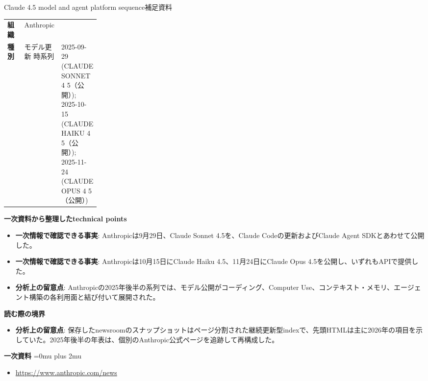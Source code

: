 \begin{technicalnote}{Claude 4.5 model and agent platform sequence}{補足資料}
\begingroup
\begin{tabularx}{\linewidth}{@{}>{\bfseries}p{0.22\linewidth}X@{}}
組織 & Anthropic \\
種別 & モデル更新
時系列 & 2025-09-29 (CLAUDE SONNET 4 5（公開）); 2025-10-15 (CLAUDE HAIKU 4 5（公開）); 2025-11-24 (CLAUDE OPUS 4 5（公開）) \\
\end{tabularx}
\smallskip
{\bfseries 一次資料から整理したtechnical points}
\begin{itemize}[leftmargin=1.5em,itemsep=0.35em]
\item \textbf{一次情報で確認できる事実}: Anthropicは9月29日、Claude Sonnet 4.5を、Claude Codeの更新およびClaude Agent SDKとあわせて公開した。
\item \textbf{一次情報で確認できる事実}: Anthropicは10月15日にClaude Haiku 4.5、11月24日にClaude Opus 4.5を公開し、いずれもAPIで提供した。
\item \textbf{分析上の留意点}: Anthropicの2025年後半の系列では、モデル公開がコーディング、Computer Use、コンテキスト・メモリ、エージェント構築の各利用面と結び付いて展開された。
\end{itemize}
\begin{minipage}{\linewidth}
{\bfseries 読む際の境界}
\begin{itemize}[leftmargin=1.5em,itemsep=0.35em]
\item \textbf{分析上の留意点}: 保存したnewsroomのスナップショットはページ分割された継続更新型indexで、先頭HTMLは主に2026年の項目を示していた。2025年後半の年表は、個別のAnthropic公式ページを追跡して再構成した。
\end{itemize}
\begin{samepage}
{\bfseries 一次資料}
\begingroup\sloppy
\Urlmuskip=0mu plus 2mu\relax
\begin{itemize}[leftmargin=1.5em,itemsep=0.25em]
\item {\scriptsize\url{https://www.anthropic.com/news}}
\end{itemize}
\endgroup
\end{samepage}
\end{minipage}
\endgroup
\end{technicalnote}
\medskip

